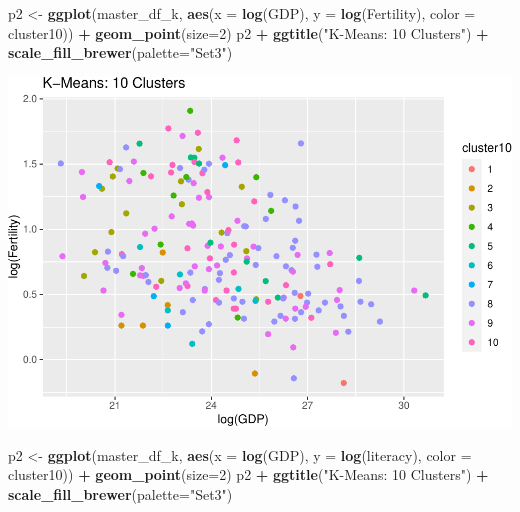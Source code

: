 \documentclass[]{article}
\newenvironment{Shaded}{\begin{snugshade}}{\end{snugshade}}
\newcommand{\DataTypeTok}[1]{\textcolor[rgb]{0.13,0.29,0.53}{#1}}
\newcommand{\DecValTok}[1]{\textcolor[rgb]{0.00,0.00,0.81}{#1}}
\newcommand{\KeywordTok}[1]{\textcolor[rgb]{0.13,0.29,0.53}{\textbf{#1}}}
\newcommand{\NormalTok}[1]{#1}
\newcommand{\OperatorTok}[1]{\textcolor[rgb]{0.81,0.36,0.00}{\textbf{#1}}}
\newcommand{\StringTok}[1]{\textcolor[rgb]{0.31,0.60,0.02}{#1}}
\begin{document}
\begin{Shaded}
\begin{Highlighting}[]
\NormalTok{p2 <-}\StringTok{ }\KeywordTok{ggplot}\NormalTok{(master_df_k, }\KeywordTok{aes}\NormalTok{(}\DataTypeTok{x =} \KeywordTok{log}\NormalTok{(GDP), }\DataTypeTok{y =} \KeywordTok{log}\NormalTok{(Fertility), }\DataTypeTok{color =}\NormalTok{ cluster10)) }\OperatorTok{+}
\StringTok{  }\KeywordTok{geom_point}\NormalTok{(}\DataTypeTok{size=}\DecValTok{2}\NormalTok{)}
\NormalTok{p2 }\OperatorTok{+}\StringTok{ }\KeywordTok{ggtitle}\NormalTok{(}\StringTok{"K-Means: 10 Clusters"}\NormalTok{) }\OperatorTok{+}\StringTok{ }\KeywordTok{scale_fill_brewer}\NormalTok{(}\DataTypeTok{palette=}\StringTok{"Set3"}\NormalTok{)}
\end{Highlighting}
\end{Shaded}

\includegraphics{eda_files/figure-latex/unnamed-chunk-29-3.pdf}

\begin{Shaded}
\begin{Highlighting}[]
\NormalTok{p2 <-}\StringTok{ }\KeywordTok{ggplot}\NormalTok{(master_df_k, }\KeywordTok{aes}\NormalTok{(}\DataTypeTok{x =} \KeywordTok{log}\NormalTok{(GDP), }\DataTypeTok{y =} \KeywordTok{log}\NormalTok{(literacy), }\DataTypeTok{color =}\NormalTok{ cluster10)) }\OperatorTok{+}
\StringTok{  }\KeywordTok{geom_point}\NormalTok{(}\DataTypeTok{size=}\DecValTok{2}\NormalTok{)}
\NormalTok{p2 }\OperatorTok{+}\StringTok{ }\KeywordTok{ggtitle}\NormalTok{(}\StringTok{"K-Means: 10 Clusters"}\NormalTok{) }\OperatorTok{+}\StringTok{ }\KeywordTok{scale_fill_brewer}\NormalTok{(}\DataTypeTok{palette=}\StringTok{"Set3"}\NormalTok{)}
\end{Highlighting}
\end{Shaded}
\end{document}
